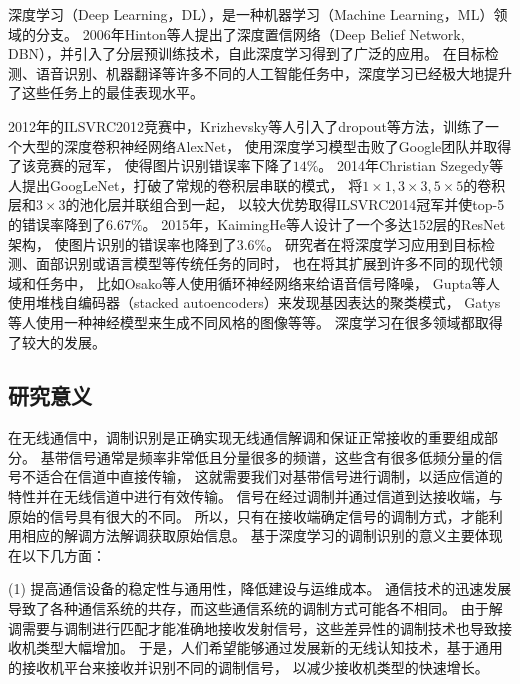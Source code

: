 深度学习（Deep Learning，DL），是一种机器学习（Machine Learning，ML）领域的分支。
2006年Hinton等人提出了深度置信网络（Deep Belief Network, DBN）\cite{hinton2006fast}，并引入了分层预训练技术，自此深度学习得到了广泛的应用。
在目标检测、语音识别、机器翻译等许多不同的人工智能任务中，深度学习已经极大地提升了这些任务上的最佳表现水平\cite{lecun2015deep}。 \par

2012年的ILSVRC2012竞赛中，Krizhevsky等人引入了dropout等方法，训练了一个大型的深度卷积神经网络AlexNet，
使用深度学习模型击败了Google团队并取得了该竞赛的冠军，
使得图片识别错误率下降了$14\%$\cite{krizhevsky2012imagenet}。
2014年Christian Szegedy等人提出GoogLeNet，打破了常规的卷积层串联的模式，
将$1 \times 1, 3 \times 3, 5 \times 5$的卷积层和$3 \times 3$的池化层并联组合到一起，
以较大优势取得ILSVRC2014冠军并使top-5的错误率降到了$6.67\%$\cite{Szegedy_2015_CVPR}。
2015年，KaimingHe等人设计了一个多达152层的ResNet架构，
使图片识别的错误率也降到了$3.6\%$\cite{he2016deep}。
研究者在将深度学习应用到目标检测、面部识别或语言模型等传统任务的同时，
也在将其扩展到许多不同的现代领域和任务中，
比如Osako等人使用循环神经网络来给语音信号降噪\cite{osako2015complex}，
Gupta等人使用堆栈自编码器（stacked autoencoders）来发现基因表达的聚类模式\cite{gupta2015learning}，
Gatys等人使用一种神经模型来生成不同风格的图像\cite{gatys2015neural}等等。
深度学习在很多领域都取得了较大的发展。\par

\subsection{研究意义}

在无线通信中，调制识别是正确实现无线通信解调和保证正常接收的重要组成部分。
基带信号通常是频率非常低且分量很多的频谱，这些含有很多低频分量的信号不适合在信道中直接传输，
这就需要我们对基带信号进行调制，以适应信道的特性并在无线信道中进行有效传输。
信号在经过调制并通过信道到达接收端，与原始的信号具有很大的不同。
所以，只有在接收端确定信号的调制方式，才能利用相应的解调方法解调获取原始信息。
基于深度学习的调制识别的意义主要体现在以下几方面：\par

(1) 提高通信设备的稳定性与通用性，降低建设与运维成本。
通信技术的迅速发展导致了各种通信系统的共存，而这些通信系统的调制方式可能各不相同。
由于解调需要与调制进行匹配才能准确地接收发射信号，这些差异性的调制技术也导致接收机类型大幅增加。
于是，人们希望能够通过发展新的无线认知技术，基于通用的接收机平台来接收并识别不同的调制信号，
以减少接收机类型的快速增长。 \par

